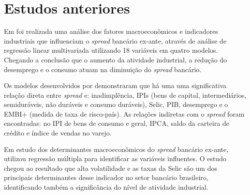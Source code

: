\documentclass[12pt,openright,oneside,a4paper,chapter=TITLE,section=TITLE,subsection=Title,english,french,spanish,portugues,sumario=tradicional]{04-class-files/abntex2}
\begin{document}
\section{Estudos anteriores}

Em \textcite{durigan:2018} foi realizada uma análise dos fatores macroeconômicos e indicadores industriais que influenciam o \emph{spread} bancário ex-ante, através de análise de regressão linear multivariada utilizando 18 variáveis em quatro modelos. Chegando a conclusão que o aumento da atividade industrial, a redução do desemprego e o consumo atuam na diminuição do \emph{spread} bancário.

Os modelos desenvolvidos por \textcite{durigan:2018} demonstraram que há uma uma significativa relação direta entre \emph{spread} e: inadimplência, IPIs (bens de capital, intermediários, semiduráveis, não duráveis e consumo duráveis), Selic, PIB, desemprego e o EMBI+ (medida de taxa de risco-país). As relações indiretas com o \emph{spread} foram encontradas: no IPI de bens de consumo e geral, IPCA, saldo da carteira de crédito e índice de vendas no varejo.

Em estudo dos determinantes macroeconômicos do \emph{spread} bancário ex-ante, \textcite{oreiro-2006} utilizou regressão múltipla para identificar as variáveis influentes. O estudo chegou ao resultado que alta volatilidade e as taxas da Selic são um dos principais determinantes desse indicador no setor bancário brasileiro, identificando também a significância do nível de atividade industrial.
\end{document}

